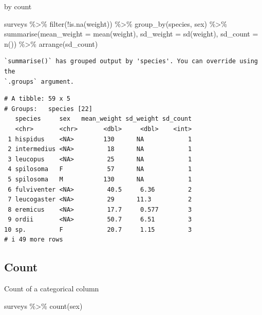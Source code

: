 \documentclass[
  letterpaper,
  DIV=11,
  numbers=noendperiod]{scrreprt}
\newenvironment{Shaded}{\begin{snugshade}}{\end{snugshade}}
\newcommand{\AttributeTok}[1]{\textcolor[rgb]{0.40,0.45,0.13}{#1}}
\newcommand{\FunctionTok}[1]{\textcolor[rgb]{0.28,0.35,0.67}{#1}}
\newcommand{\NormalTok}[1]{\textcolor[rgb]{0.00,0.23,0.31}{#1}}
\newcommand{\SpecialCharTok}[1]{\textcolor[rgb]{0.37,0.37,0.37}{#1}}
\begin{document}
by count

\begin{Shaded}
\begin{Highlighting}[]
\NormalTok{surveys }\SpecialCharTok{\%\textgreater{}\%}
  \FunctionTok{filter}\NormalTok{(}\SpecialCharTok{!}\FunctionTok{is.na}\NormalTok{(weight)) }\SpecialCharTok{\%\textgreater{}\%}
  \FunctionTok{group\_by}\NormalTok{(species, sex) }\SpecialCharTok{\%\textgreater{}\%}
  \FunctionTok{summarise}\NormalTok{(}\AttributeTok{mean\_weight =} \FunctionTok{mean}\NormalTok{(weight), }\AttributeTok{sd\_weight =} \FunctionTok{sd}\NormalTok{(weight), }\AttributeTok{sd\_count =} \FunctionTok{n}\NormalTok{()) }\SpecialCharTok{\%\textgreater{}\%}
  \FunctionTok{arrange}\NormalTok{(sd\_count)}
\end{Highlighting}
\end{Shaded}

\begin{verbatim}
`summarise()` has grouped output by 'species'. You can override using the
`.groups` argument.
\end{verbatim}

\begin{verbatim}
# A tibble: 59 x 5
# Groups:   species [22]
   species     sex   mean_weight sd_weight sd_count
   <chr>       <chr>       <dbl>     <dbl>    <int>
 1 hispidus    <NA>        130      NA            1
 2 intermedius <NA>         18      NA            1
 3 leucopus    <NA>         25      NA            1
 4 spilosoma   F            57      NA            1
 5 spilosoma   M           130      NA            1
 6 fulviventer <NA>         40.5     6.36         2
 7 leucogaster <NA>         29      11.3          2
 8 eremicus    <NA>         17.7     0.577        3
 9 ordii       <NA>         50.7     6.51         3
10 sp.         F            20.7     1.15         3
# i 49 more rows
\end{verbatim}

\subsection{Count}\label{count}

Count of a categorical column

\begin{Shaded}
\begin{Highlighting}[]
\NormalTok{surveys }\SpecialCharTok{\%\textgreater{}\%}
  \FunctionTok{count}\NormalTok{(sex)}
\end{Highlighting}
\end{Shaded}
\end{document}
